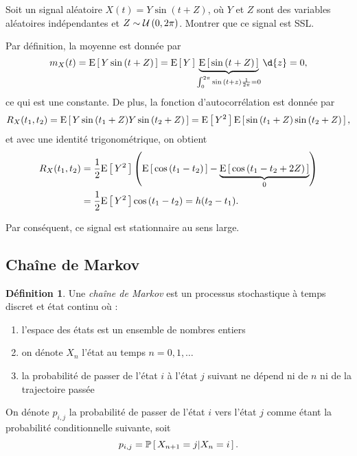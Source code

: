 \documentclass[11pt]{article}
\makeatletter
\newcommand\Pg[2]{%
	\ensuremath{%
		\mathbb{P}\left[\,#1\middle\rvert#2\,\right]%
	}%
}%
\newcommand\Uni[2]{%
	\ensuremath{%
		\mathcal{U}\left(#1,#2\right)%
	}%
}%
\newcommand\Esp[1]{%
	\ensuremath{%
		\mathrm{E}\left[\,#1\,\right]%
	}%
}%
\theoremstyle{remark}
\theoremstyle{definition}
\newtheorem*{@definition}{Définition}
\newenvironment{definition}{%
	\begin{@definition}%
}{%
	\end{@definition}%
	\setcounter{property}{0}%
}
\makeatother
\begin{document}
\begin{exemple}
	Soit un signal aléatoire $X(t)=Y\sin{(t+Z)}$, où $Y$ et $Z$ sont des
	variables aléatoires indépendantes et $Z\sim\Uni{0}{2\pi}$. Montrer que ce
	signal est SSL.

	Par définition, la moyenne est donnée par
	\begin{equation*}
		m_X(t)
		=\Esp{Y\sin{(t+Z)}}
		=\Esp{Y}\underbrace{\Esp{\sin{(t+Z)}}}_{
			\int_0^{2\pi}\sin{(t+z)}\frac{1}{2\pi}=0}\d{z}
		=0,
	\end{equation*}
	ce qui est une constante. De plus, la fonction d'autocorrélation est donnée
	par
	\begin{equation*}
		R_X(t_1,t_2)
		=\Esp{Y\sin{(t_1+Z)}Y\sin{(t_2+Z)}}
		=\Esp{Y^2}\Esp{\sin{(t_1+Z)}\sin{(t_2+Z)}},
	\end{equation*}
	et avec une identité trigonométrique, on obtient
	\begin{equation*}
		\begin{split}
			R_X(t_1,t_2)
			&=\frac{1}{2}\Esp{Y^2}\left(
				\Esp{\cos{(t_1-t_2)}}-\underbrace{\Esp{\cos{(t_1-t_2+2Z)}}}_0
			\right)\\
			&=\frac{1}{2}\Esp{Y^2}\cos{(t_1-t_2)}
			=h(t_2-t_1).
		\end{split}
	\end{equation*}

	Par conséquent, ce signal est stationnaire au sens large.
\end{exemple}

\subsection{Chaîne de Markov}
\begin{definition}
	Une \textit{chaîne de Markov} est un processus stochastique à temps discret
	et état continu où :
	\begin{enumerate}
		\item l'espace des états est un ensemble de nombres entiers
		\item on dénote $X_n$ l'état au temps $n=0,1,\dots$
		\item la probabilité de passer de l'état $i$ à l'état $j$ suivant ne
		      dépend ni de $n$ ni de la trajectoire passée
	\end{enumerate}
\end{definition}

On dénote $p_{i,j}$ la probabilité de passer de l'état $i$ vers l'état $j$
comme étant la probabilité conditionnelle suivante, soit
\begin{equation*}
	p_{i,j}=\Pg{X_{n+1}=j}{X_n=i}.
\end{equation*}
\end{document}
